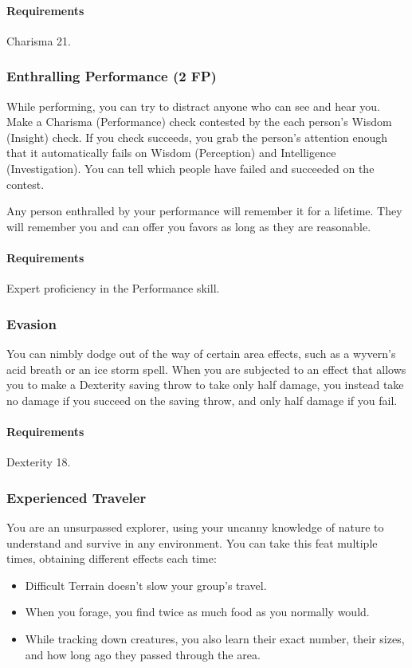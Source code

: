     \paragraph{Requirements} Charisma 21.
\subsubsection{Enthralling Performance (2 FP)} \label{feat::enthrallingperformance}
    While performing, you can try to distract anyone who can see and hear you.
    Make a Charisma (Performance) check contested by the each person's Wisdom (Insight) check.
    If you check succeeds, you grab the person's attention enough that it automatically fails on Wisdom (Perception) and Intelligence (Investigation).
    You can tell which people have failed and succeeded on the contest.

    Any person enthralled by your performance will remember it for a lifetime.
    They will remember you and can offer you favors as long as they are reasonable.
    \paragraph{Requirements} Expert proficiency in the Performance skill.
\subsubsection{Evasion} \label{feat::evasion}
    You can nimbly dodge out of the way of certain area effects, such as a wyvern's acid breath or an ice storm spell.
    When you are subjected to an effect that allows you to make a Dexterity saving throw to take only half damage, you instead take no damage if you succeed on the saving throw, and only half damage if you fail.
    \paragraph{Requirements} Dexterity 18.
\subsubsection{Experienced Traveler} \label{feat::experiencedtraveler}
    You are an unsurpassed explorer, using your uncanny knowledge of nature to understand and survive in any environment.
    You can take this feat multiple times, obtaining different effects each time:
    \begin{itemize}
        \item Difficult Terrain doesn't slow your group's travel.
        \item When you forage, you find twice as much food as you normally would.
        \item While tracking down creatures, you also learn their exact number, their sizes, and how long ago they passed through the area.
    \end{itemize}
